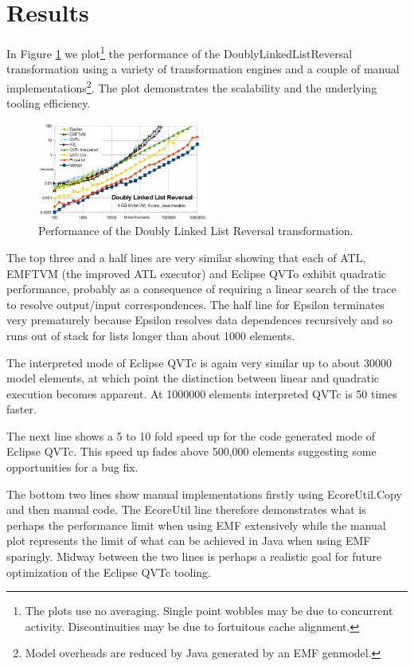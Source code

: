 \documentclass[conference]{IEEEtran}
\begin{document}
\section{Results}\label{Results}

In Figure \ref{fig:DoublyLinkedListReversalPerformance} we plot\footnote{The plots use no averaging. Single point wobbles may be due to concurrent activity. Discontinuities may be due to fortuitous cache alignment.} the performance of the DoublyLinkedListReversal transformation using a variety of transformation engines and a couple of manual implementations\footnote{Model overheads are reduced by Java generated by an EMF genmodel.}. The plot demonstrates the scalability and the underlying tooling efficiency.

\begin{figure}[h]
	\centering
	\includegraphics[width=0.5\textwidth]{DoublyLinkedListReversalPerformance.png}
	\caption{Performance of the Doubly Linked List Reversal transformation.}
	\label{fig:DoublyLinkedListReversalPerformance}
\end{figure}

The top three and a half lines are very similar showing that each of ATL, EMFTVM (the improved ATL executor) and Eclipse QVTo exhibit quadratic performance, probably as a consequence of requiring a linear search of the trace to resolve output/input correspondences. The half line for Epsilon terminates very prematurely because Epsilon resolves data dependences recursively and so runs out of stack for lists longer than about 1000 elements.

The interpreted mode of Eclipse QVTc is again very similar up to about 30000 model elements, at which point the distinction between linear and quadratic execution becomes apparent. At 1000000 elements interpreted QVTc is 50 times faster.

The next line shows a 5 to 10 fold speed up for the code generated mode of Eclipse QVTc. This speed up fades above 500,000 elements suggesting some opportunities for a bug fix.

The bottom two lines show manual implementations firstly using EcoreUtil.Copy and then manual code. The EcoreUtil line therefore demonstrates what is perhaps the performance limit when using EMF extensively while the manual plot represents the limit of what can be achieved in Java when using EMF sparingly. Midway between the two lines is perhaps a realistic goal for future optimization of the Eclipse QVTc tooling.
\end{document}
